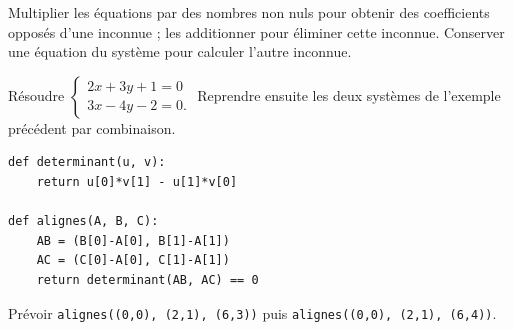\begin{method}
Multiplier les équations par des nombres non nuls pour obtenir des coefficients opposés d'une inconnue ; les additionner pour éliminer cette inconnue. Conserver une équation du système pour calculer l'autre inconnue.
\end{method}
\begin{example}Résoudre $\begin{cases}2x+3y+1=0\\3x-4y-2=0.\end{cases}$ Reprendre ensuite les deux systèmes de l'exemple précédent par combinaison.\end{example}
\begin{lstlisting}
def determinant(u, v):
    return u[0]*v[1] - u[1]*v[0]

def alignes(A, B, C):
    AB = (B[0]-A[0], B[1]-A[1])
    AC = (C[0]-A[0], C[1]-A[1])
    return determinant(AB, AC) == 0
\end{lstlisting}
\begin{example}Prévoir \texttt{alignes((0,0), (2,1), (6,3))} puis \texttt{alignes((0,0), (2,1), (6,4))}.\end{example}
